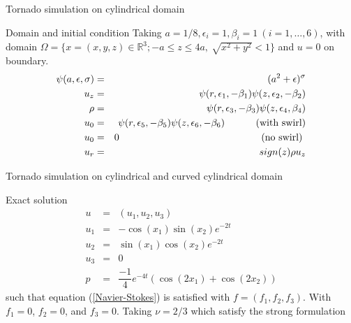\documentclass{beamer}
\newcommand{\R}{\mathbb{R}}
\begin{document}
\begin{frame}{Tornado simulation on cylindrical domain}
	\begin{block}{Domain and initial condition}
		Taking $ a=1/8, \epsilon_{i} =1, \beta_{i}=1 \ (i=1,\dots,6) $, with domain $ \Omega = \{ x=(x,y,z) \in \R^3 ; -a\leq z\leq 4a, \ \sqrt{x^2+y^2}<1 \} $ and $ u=0 $ on boundary.
		\begin{eqnarray}\nonumber
		\psi(a,\epsilon,\sigma) &=& (a^{2}+\epsilon)^{\sigma}\\ \nonumber
		u_{z} &=& \psi(r,\epsilon_{1},-\beta_{1})\psi(z,\epsilon_{2},-\beta_{2})\\ \nonumber
		\rho &=& \psi(r,\epsilon_{3},-\beta_{3})\psi(z,\epsilon_{4},\beta_{4})\\ \nonumber
		u_{0} &=& \psi(r,\epsilon_{5},-\beta_{5})\psi(z,\epsilon_{6},-\beta_{6}) \text{\hspace{1cm} (with swirl)}\\ \nonumber
		u_{0} &=& 0 \text{ \hspace{5cm}(no swirl) }\\ \nonumber
		u_{r} &=& sign(z)\rho u_{z}
		\end{eqnarray}
	\end{block}
\end{frame}

\begin{frame}{Tornado simulation on cylindrical and curved cylindrical domain}
\begin{block}{Exact solution}
	\begin{eqnarray}\nonumber
	u &=& (u_{1},u_{2},u_{3}) \\ \nonumber
	u_{1} &=& -\cos(x_{1}) \sin(x_{2}) e^{-2t}\\ \nonumber
	u_{2} &=& \sin(x_{1}) \cos(x_{2}) e^{-2t}\\ \nonumber
	u_{3} &=& 0 \\ \nonumber
	p&=& \dfrac{-1}{4} e^{-4t} (\cos(2x_1)+\cos(2x_2))
	\end{eqnarray}
	such that equation (\ref{Navier-Stokes}) is satisfied with $ f = (f_{1},f_{2},f_3) $. With $ f_{1} =0 $, $ f_{2} = 0  $, and $ f_{3} = 0  $. Taking $ \nu=2/3 $ which satisfy the strong formulation
\end{block}
\end{frame}
\end{document}
